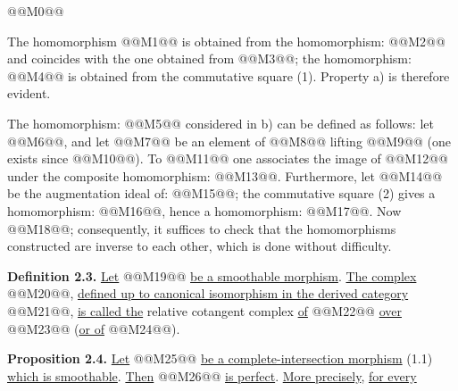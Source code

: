 @@M0@@

The homomorphism @@M1@@ is obtained from the homomorphism: @@M2@@ and coincides with the one obtained from @@M3@@; the homomorphism: @@M4@@ is obtained from the commutative square (1). Property a) is therefore evident.

The homomorphism: @@M5@@ considered in b) can be defined as follows: let @@M6@@, and let @@M7@@ be an element of @@M8@@ lifting @@M9@@ (one exists since @@M10@@). To @@M11@@ one associates the image of @@M12@@ under the composite homomorphism: @@M13@@. Furthermore, let @@M14@@ be the augmentation ideal of: @@M15@@; the commutative square (2) gives a homomorphism: @@M16@@, hence a homomorphism: @@M17@@. Now @@M18@@; consequently, it suffices to check that the homomorphisms constructed are inverse to each other, which is done without difficulty.

\textbf{Definition 2.3.} \uline{Let} @@M19@@ \uline{be a smoothable morphism}. \uline{The complex} @@M20@@, \uline{defined up to canonical isomorphism in the derived category} @@M21@@, \uline{is called the} relative cotangent complex \uline{of} @@M22@@ \uline{over} @@M23@@ (\uline{or of} @@M24@@).

\textbf{Proposition 2.4.} \uline{Let} @@M25@@ \uline{be a complete-intersection morphism} (1.1) \uline{which is smoothable}. \uline{Then} @@M26@@ \uline{is perfect}. \uline{More precisely}, \uline{for every}
